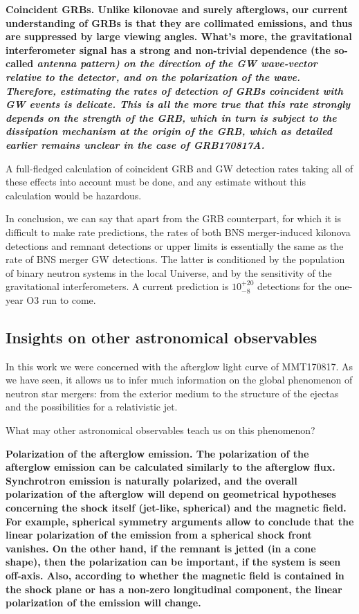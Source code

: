 \bf{Coincident GRBs. }Unlike kilonovae and surely afterglows, our current understanding of GRBs is that they are collimated emissions, and thus are suppressed by large viewing angles. What's more, the gravitational interferometer signal has a strong and non-trivial dependence (the so-called \it{antenna pattern}) on the direction of the GW wave-vector relative to the detector, and on the polarization of the wave. Therefore, estimating the rates of detection of GRBs coincident with GW events is delicate. This is all the more true that this rate strongly depends on the strength of the GRB, which in turn is subject to the dissipation mechanism at the origin of the GRB, which as detailed earlier remains unclear in the case of GRB170817A.

A full-fledged calculation of coincident GRB and GW detection rates taking all of these effects into account must be done, and any estimate without this calculation would be hazardous.

In conclusion, we can say that apart from the GRB counterpart, for which it is difficult to make rate predictions, the rates of both BNS merger-induced kilonova detections and remnant detections or upper limits is essentially the same as the rate of BNS merger GW detections. The latter is conditioned by the population of binary neutron systems in the local Universe, and by the sensitivity of the gravitational interferometers. A current prediction is $10^{+20}_{-8}$ detections for the one-year O3 run to come.

\subsection{Insights on other astronomical observables}

In this work we were concerned with the afterglow light curve of MMT170817. As we have seen, it allows us to infer much information on the global phenomenon of neutron star mergers: from the exterior medium to the structure of the ejectas and the possibilities for a relativistic jet.

What may other astronomical observables teach us on this phenomenon?

\bf{Polarization of the afterglow emission.} The polarization of the afterglow emission can be calculated similarly to the afterglow flux. Synchrotron emission is naturally polarized, and the overall polarization of the afterglow will depend on geometrical hypotheses concerning the shock itself (jet-like, spherical) and the magnetic field. For example, spherical symmetry arguments allow to conclude that the linear polarization of the emission from  a spherical shock front vanishes. On the other hand, if the remnant is jetted (in a cone shape), then the polarization can be important, if the system is seen off-axis. Also, according to whether the magnetic field is contained in the shock plane or has a non-zero longitudinal component, the linear polarization of the emission will change.

